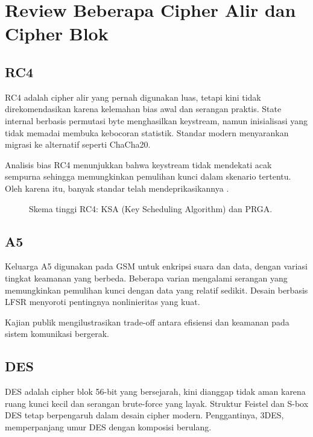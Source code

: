 \documentclass[../main.tex]{subfiles}
\begin{document}
\chapter{Review Beberapa Cipher Alir dan Cipher Blok}

\section{RC4}
RC4 adalah cipher alir yang pernah digunakan luas, tetapi kini tidak direkomendasikan karena kelemahan bias awal dan serangan praktis. State internal berbasis permutasi byte menghasilkan keystream, namun inisialisasi yang tidak memadai membuka kebocoran statistik. Standar modern menyarankan migrasi ke alternatif seperti ChaCha20.

Analisis bias RC4 menunjukkan bahwa keystream tidak mendekati acak sempurna sehingga memungkinkan pemulihan kunci dalam skenario tertentu. Oleh karena itu, banyak standar telah mendeprikasikannya \parencite{rfc7465,mironov2002rc4}.

\begin{figure}[h]
\centering
{}
\caption{Skema tinggi RC4: KSA (Key Scheduling Algorithm) dan PRGA.}
\label{fig:rc4}
\end{figure}

\section{A5}
Keluarga A5 digunakan pada GSM untuk enkripsi suara dan data, dengan variasi tingkat keamanan yang berbeda. Beberapa varian mengalami serangan yang memungkinkan pemulihan kunci dengan data yang relatif sedikit. Desain berbasis LFSR menyoroti pentingnya nonlinieritas yang kuat.

Kajian publik mengilustrasikan trade-off antara efisiensi dan keamanan pada sistem komunikasi bergerak.

\section{DES}
DES adalah cipher blok 56-bit yang bersejarah, kini dianggap tidak aman karena ruang kunci kecil dan serangan brute-force yang layak. Struktur Feistel dan S-box DES tetap berpengaruh dalam desain cipher modern. Penggantinya, 3DES, memperpanjang umur DES dengan komposisi berulang.
\end{document}

